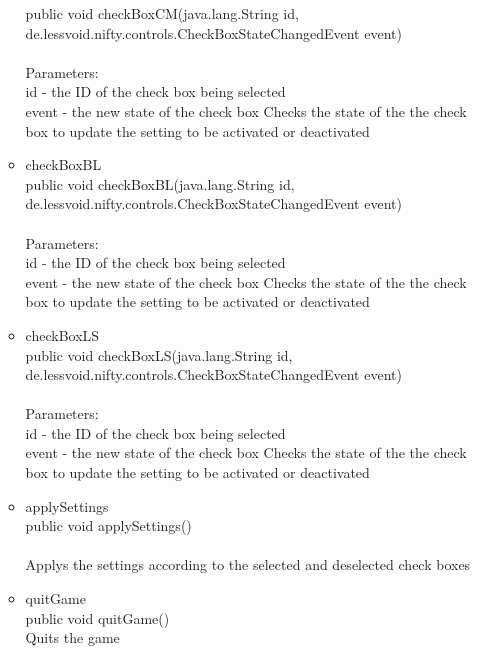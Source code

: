 \documentclass[letterpaper]{article}
\begin{document}
\begin{itemize}
\begin{itemize}
													public void checkBoxCM(java.lang.String id, \\
				              de.lessvoid.nifty.controls.CheckBoxStateChangedEvent event) \\ \\
													Parameters: \\
													id - the ID of the check box being selected \\
													event - the new state of the check box Checks the state of the the check box to update the setting to be activated or deactivated
											\item	checkBoxBL \\
													public void checkBoxBL(java.lang.String id, \\
				              de.lessvoid.nifty.controls.CheckBoxStateChangedEvent event) \\ \\
													Parameters: \\
													id - the ID of the check box being selected \\
													event - the new state of the check box Checks the state of the the check box to update the setting to be activated or deactivated
											\item	checkBoxLS \\
													public void checkBoxLS(java.lang.String id, \\
				              de.lessvoid.nifty.controls.CheckBoxStateChangedEvent event) \\ \\
													Parameters: \\
													id - the ID of the check box being selected \\
													event - the new state of the check box Checks the state of the the check box to update the setting to be activated or deactivated
											\item	applySettings \\
													public void applySettings() \\ \\
													Applys the settings according to the selected and deselected check boxes
											\item	quitGame \\
													public void quitGame() \\
													Quits the game
										\end{itemize}
							\end{itemize}
\end{document}
